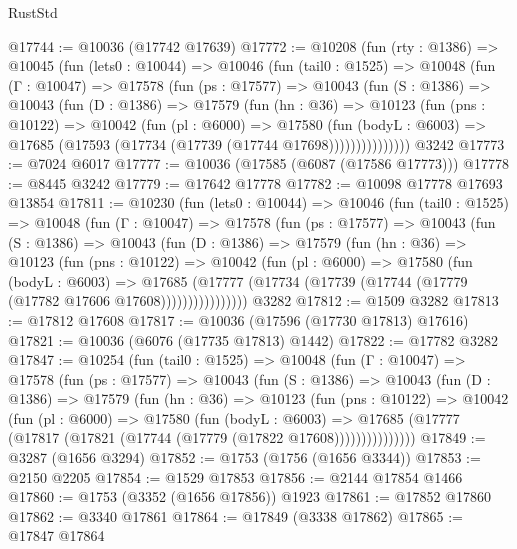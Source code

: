 \begin{lexlean}{RustStd}
\begin{coremodule}
{{@17744 := @10036 (@17742 @17639)
@17772 := @10208
    (fun (rty : @1386) =>
    @10045
      (fun (lets0 : @10044) =>
      @10046
        (fun (tail0 : @1525) =>
        @10048
          (fun (Γ : @10047) =>
          @17578
            (fun (ps : @17577) =>
            @10043
              (fun (S : @1386) =>
              @10043
                (fun (D : @1386) =>
                @17579
                  (fun (hn : @36) =>
                  @10123
                    (fun (pns : @10122) =>
                    @10042
                      (fun (pl : @6000) =>
                      @17580
                        (fun (bodyL : @6003) =>
                        @17685 (@17593 (@17734 (@17739 (@17744 @17698)))))))))))))))
    @3242
@17773 := @7024 @6017
@17777 := @10036 (@17585 (@6087 (@17586 @17773)))
@17778 := @8445 @3242
@17779 := @17642 @17778
@17782 := @10098 @17778 @17693 @13854
@17811 := @10230
    (fun (lets0 : @10044) =>
    @10046
      (fun (tail0 : @1525) =>
      @10048
        (fun (Γ : @10047) =>
        @17578
          (fun (ps : @17577) =>
          @10043
            (fun (S : @1386) =>
            @10043
              (fun (D : @1386) =>
              @17579
                (fun (hn : @36) =>
                @10123
                  (fun (pns : @10122) =>
                  @10042
                    (fun (pl : @6000) =>
                    @17580
                      (fun (bodyL : @6003) =>
                      @17685
                        (@17777
                          (@17734 (@17739 (@17744 (@17779 (@17782 @17606 @17608))))))))))))))))
    @3282
@17812 := @1509 @3282
@17813 := @17812 @17608
@17817 := @10036 (@17596 (@17730 @17813) @17616)
@17821 := @10036 (@6076 (@17735 @17813) @1442)
@17822 := @17782 @3282
@17847 := @10254
    (fun (tail0 : @1525) =>
    @10048
      (fun (Γ : @10047) =>
      @17578
        (fun (ps : @17577) =>
        @10043
          (fun (S : @1386) =>
          @10043
            (fun (D : @1386) =>
            @17579
              (fun (hn : @36) =>
              @10123
                (fun (pns : @10122) =>
                @10042
                  (fun (pl : @6000) =>
                  @17580
                    (fun (bodyL : @6003) =>
                    @17685 (@17777 (@17817 (@17821 (@17744 (@17779 (@17822 @17608)))))))))))))))
@17849 := @3287 (@1656 @3294)
@17852 := @1753 (@1756 (@1656 @3344))
@17853 := @2150 @2205
@17854 := @1529 @17853
@17856 := @2144 @17854 @1466
@17860 := @1753 (@3352 (@1656 @17856)) @1923
@17861 := @17852 @17860
@17862 := @3340 @17861
@17864 := @17849 (@3338 @17862)
@17865 := @17847 @17864
}}
\end{coremodule}
\end{lexlean}
